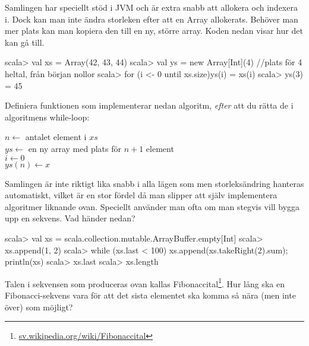 \Subtask Samlingen  har speciellt stöd i JVM och är extra snabb att allokera och indexera i. Dock kan man inte ändra storleken efter att en Array allokerats. Behöver man mer plats kan man kopiera den till en ny, större array. Koden nedan visar hur det kan gå till.
\begin{REPL}
scala> val xs = Array(42, 43, 44)
scala> val ys = new Array[Int](4)  //plats för 4 heltal, från början nollor
scala> for (i <- 0 until xs.size){ys(i) = xs(i)}
scala> ys(3) = 45
\end{REPL}
Definiera funktionen  som implementerar nedan algoritm, \emph{efter} att du rätta de \textbf{\color{red}{två buggarna}} i algoritmens while-loop:

\begin{algorithm}[H]
 
 $n \leftarrow$ antalet element i $xs$ \\
 $ys \leftarrow$ en ny array med plats för $n + 1$ element\\
 $i \leftarrow 0$  \\
 $ys(n) \leftarrow x$ 
\end{algorithm}



\Subtask Samlingen  är inte riktigt lika snabb i alla lägen som  men storleksändring hanteras automatiskt, vilket är en stor fördel då man slipper att själv implementera algoritmer liknande  ovan. Speciellt använder man ofta  om man stegvis vill bygga upp en sekvens. Vad händer nedan?
\begin{REPL}
scala> val xs = scala.collection.mutable.ArrayBuffer.empty[Int]
scala> xs.append(1, 2)
scala> while (xs.last < 100) {xs.append(xs.takeRight(2).sum); println(xs)}
scala> xs.last
scala> xs.length
\end{REPL}

\Subtask Talen i sekvensen som produceras ovan kallas Fibonaccital\footnote{\href{https://sv.wikipedia.org/wiki/Fibonaccital}{sv.wikipedia.org/wiki/Fibonaccital}}. Hur lång ska en Fibonacci-sekvens vara för att det sista elementet ska komma så nära (men inte över)  som möjligt?



